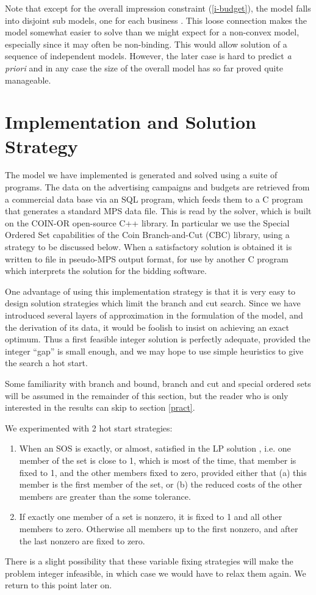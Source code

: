 \documentclass[finalversion,simpleeqnnos]{yrl}
\begin{document}
Note that except for the overall impression constraint (\ref{i-budget}), the model falls into disjoint sub models, one for each business . This loose connection makes the model somewhat easier to solve than we might expect for a non-convex model, especially since it may often be non-binding. This would allow solution of a sequence of independent models. However, the later case is hard to predict {\em a priori} and in any case the size of the overall model has so far proved quite manageable.

\section{Implementation and Solution Strategy}

The model we have implemented is generated and solved using a suite of programs. The data on the advertising campaigns and budgets are retrieved from a commercial data base via an SQL program, which feeds them to a C program that generates a standard MPS data file. This is read by the solver, which is built on the COIN-OR open-source C++ library\cite{coin1}. In particular we use the Special Ordered Set capabilities of the Coin Branch-and-Cut (CBC) library\cite{coin2}, using a strategy to be discussed below. When a satisfactory solution is obtained it is written to file in pseudo-MPS output format, for use by another C program which interprets the solution for the bidding software.

One advantage of using this implementation strategy is that it is very easy to design solution strategies which limit the branch and cut search. Since we have introduced several layers of approximation in the formulation of the model, and the derivation of its data, it would be foolish to insist on achieving an exact optimum. Thus a first feasible integer solution is perfectly adequate, provided the integer ``gap'' is small enough, and we may hope to use simple heuristics to give the search a hot start. 

Some familiarity with branch and bound, branch and cut and special ordered sets will be assumed in the remainder of this section, but the reader who is only interested in the results can skip to section \ref{pract}.

We experimented with 2 hot start strategies:
\begin{enumerate}
\item When an SOS is exactly, or almost, satisfied in the LP solution , i.e. one member of the set is close to 1, which is most of the time, that member is fixed to 1, and the other members fixed to zero, provided either that (a) this member is the first member of the set, or (b) the reduced costs of the other members are greater than the some tolerance.
\item If exactly one member of a set is nonzero, it is fixed to 1 and all other members to zero. Otherwise all members up to the first nonzero, and after the last nonzero are fixed to zero.
\end{enumerate} 
There is a slight possibility that these variable fixing strategies will make the problem integer infeasible, in which case we would have to relax them again. We return to this point later on.
\end{document}

